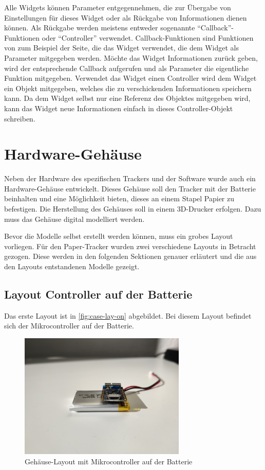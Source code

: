 Alle Widgets können Parameter entgegennehmen, die zur Übergabe von Einstellungen für dieses Widget oder als Rückgabe
von Informationen dienen können.
Als Rückgabe werden meistens entweder sogenannte \enquote{Callback}-Funktionen oder \enquote{Controller} verwendet.
Callback-Funktionen sind Funktionen von zum Beispiel der Seite, die das Widget verwendet, die dem Widget als Parameter
mitgegeben werden.
Möchte das Widget Informationen zurück geben, wird der entsprechende Callback aufgerufen und als Parameter die eigentliche
Funktion mitgegeben.
Verwendet das Widget einen Controller wird dem Widget ein Objekt mitgegeben, welches die zu verschickenden
Informationen speichern kann.
Da dem Widget selbst nur eine Referenz des Objektes mitgegeben wird, kann das Widget neue Informationen einfach in dieses
Controller-Objekt schreiben.

\section{Hardware-Gehäuse}

Neben der Hardware des spezifischen Trackers und der Software wurde auch ein Hardware-Gehäuse entwickelt.
Dieses Gehäuse soll den Tracker mit der Batterie beinhalten und eine Möglichkeit bieten, dieses an einem Stapel Papier zu befestigen.
Die Herstellung des Gehäuses soll in einem 3D-Drucker erfolgen.
Dazu muss das Gehäuse digital modelliert werden.

Bevor die Modelle selbst erstellt werden können, muss ein grobes Layout vorliegen.
Für den Paper-Tracker wurden zwei verschiedene Layouts in Betracht gezogen.
Diese werden in den folgenden Sektionen genauer erläutert und die aus den Layouts entstandenen Modelle gezeigt.

\subsection{Layout Controller auf der Batterie}
Das erste Layout ist in \autoref{fig:case-lay-on} abgebildet.
Bei diesem Layout befindet sich der Mikrocontroller auf der Batterie.

\begin{figure}[htbp]
	\includegraphics[width=300px]{images/case/pico_on_battery.jpg}
	\centering
	\caption{Gehäuse-Layout mit Mikrocontroller auf der Batterie}
	\label{fig:case-lay-on}
\end{figure}


